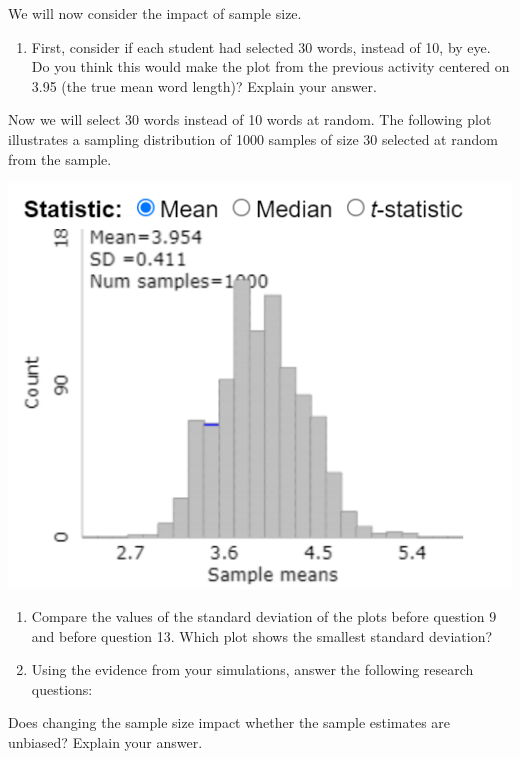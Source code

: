 \documentclass[
]{report}
\providecommand{\tightlist}{%
  \setlength{\itemsep}{0pt}\setlength{\parskip}{0pt}}
\newcommand{\rgi}{\hspace{24pt}}  %
\begin{document}
We will now consider the impact of sample size.

\begin{enumerate}
\def\labelenumi{\arabic{enumi}.}
\setcounter{enumi}{11}
\tightlist
\item
  First, consider if each student had selected 30 words, instead of 10, by eye. Do you think this would make the plot from the previous activity centered on 3.95 (the true mean word length)? Explain your answer.
  \vspace{0.4in}
\end{enumerate}

\newpage

Now we will select 30 words instead of 10 words at random. The following plot illustrates a sampling distribution of 1000 samples of size 30 selected at random from the sample.

\begin{center}\includegraphics[width=0.75\linewidth]{images/bencenti_sampling30} \end{center}

\begin{enumerate}
\def\labelenumi{\arabic{enumi}.}
\setcounter{enumi}{12}
\item
  Compare the values of the standard deviation of the plots before question 9 and before question 13. Which plot shows the smallest standard deviation?
  \vspace{0.4in}
\item
  Using the evidence from your simulations, answer the following research questions:
\end{enumerate}

\rgi Does changing the sample size impact whether the sample estimates are unbiased? Explain your answer.
\vspace{0.5in}
\end{document}
